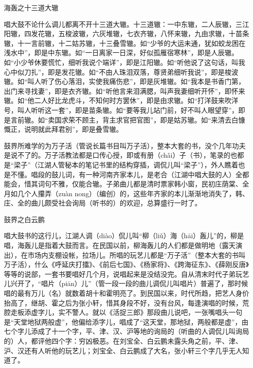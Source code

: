 \documentclass[12pt,UTF8]{ctexbook}
\begin{document}
海轰之十三道大辙


唱大鼓不论什么调儿都离不开十三道大辙。十三道辙：一中东辙，二人辰辙，三江阳辙，四发花辙，五梭波辙，六灰堆辙，七衣齐辙，八怀来辙，九由求辙，十苗条辙，十一言前辙，十二姑苏辙，十三叠雪辙。如“少爷的大运未通，犹如蛟龙困在浅水中”，即是中东辙。如“一日离家一日深，好似孤雁宿寒林”，即是人辰辙。如“小少爷休要慌忙，细听我说个端详”，即是江阳辙。如“听他说了这句话，叫我心中似刀扎”，即是发花辙。如“不由人珠泪双落，尊贤弟细听我说”，即是梭波辙。如“叫人听了伤心落泪，实使我痛伤悲”，即是灰堆辙。如“我本是书香门第，出门来寻找妻”，即是衣齐辙。如“听他言来泪满腮，叫声我妻细听开怀”，即怀来辙。如“他二人好比龙虎斗，不知何时方罢休”，即是由求辙。如“打洋鼓来吹洋号，叫人听听这一套”，即是苗条辙。如“要等我儿站门前，好不叫人眼望穿”，即是言前辙。如“卖国求荣不顾主，背主求官把官图”，即是姑苏辙。如“来清去白慷慨正，说明就此拜君别”，即是叠雪辙。

鼓界所难学的为万子活（管说长篇书目叫万子活），整本大套的书，没个几年功夫是说不了的。万子活教法都是口传心授，即或有册（chǎi）子（书），笔录的也都是“梁子”（江湖人管秘本的笔记书里的结构穿插，调侃儿叫“梁子”），外人瞧着也是不懂。唱段的鼓儿词，有一种河南齐家本儿，是老合（江湖中唱大鼓的人）全都能会，惜其词句不雅，仅能合辙。子弟曲儿都是清时票家韩小窗，民初庄荫棠、全月如几个人攥弄（zuàn nong）（编创）的，这些年齐家的本儿渐渐地消失了，韩、庄、全的曲儿颇受社会询局（听书的）的欢迎，总算盛行一时了。





鼓界之白云鹏


唱大鼓书的这行儿，江湖人调（diào）侃儿叫“柳（liǔ）海（hāi）轰儿”的，柳是唱，海轰儿是指着大鼓而言。在民国以前，柳海轰儿的人们都是做明地（露天演出），在市场内支棚设帐，拉场儿。所唱的玩艺儿都是“万子活”（整本大套的书叫万子活），什么《呼延庆打擂》、《前后七国》、《杨家将》、《跨海征东》、《薛刚反唐》等等的说部，一套书要唱好几个月，说唱起来是没结没完。自从清末时代子弟玩艺儿兴开了，“唱片（piān）儿”（管一段一段的曲儿调侃儿叫唱片）普遍了，那时候唱的最有万儿（名）就数着胡十和霍明亮了。到民国以来，时代所趋，把艺人身价抬高了，继胡、霍之后为张小轩，惜其身段不好，没有台风，每逢演唱的时候，荒腔走板添虚字儿，实不警人。就以《活捉三郎》那段曲儿说吧，一张嘴唱头一句是“天堂地狱两般虚”，他偏给添字儿，唱成了“这天堂，那地狱，两般都是虚”，由七个字儿添成了十一个字，平、津、汉、沪等地的询局的（听曲的人调侃儿叫询局的）人，都评他四个字：穷凶极恶。在刘宝全、白云鹏未露头角之前，平、津、沪、汉还有人听他的玩艺儿；刘宝全、白云鹏成了大名，张小轩三个字几乎无人知道了。
\end{document}
